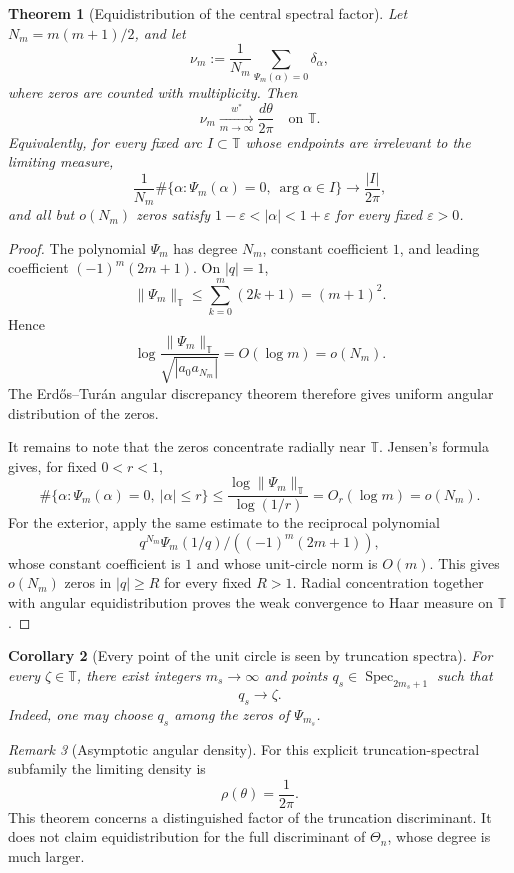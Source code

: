 \documentclass[11pt,a4paper,reqno]{amsart}
\newtheorem{theorem}{Theorem}[section]
\newtheorem{corollary}[theorem]{Corollary}
\theoremstyle{remark}
\newtheorem{remark}[theorem]{Remark}
\newcommand{\T}{\mathbb T}
\newcommand{\Spec}{\operatorname{Spec}}
\begin{document}
\begin{theorem}[Equidistribution of the central spectral factor]\label{thm:equidistribution}
Let \(N_m=m(m+1)/2\), and let
\[
        \nu_m:=\frac1{N_m}\sum_{\Psi_m(\alpha)=0}\delta_{\alpha},
\]
where zeros are counted with multiplicity.  Then
\[
        \nu_m\xrightarrow[m\to\infty]{w^*}\frac{d\theta}{2\pi}\quad\text{on }\T.
\]
Equivalently, for every fixed arc \(I\subset\T\) whose endpoints are irrelevant to the limiting measure,
\[
        \frac1{N_m}\#\{\alpha:\Psi_m(\alpha)=0,\ \arg\alpha\in I\}
        \longrightarrow \frac{|I|}{2\pi},
\]
and all but \(o(N_m)\) zeros satisfy \(1-\varepsilon<|\alpha|<1+\varepsilon\) for every fixed \(\varepsilon>0\).
\end{theorem}

\begin{proof}
The polynomial \(\Psi_m\) has degree \(N_m\), constant coefficient \(1\), and leading coefficient \((-1)^m(2m+1)\).  On \(|q|=1\),
\[
        \|\Psi_m\|_{\T}\le \sum_{k=0}^m(2k+1)=(m+1)^2.
\]
Hence
\[
        \log\frac{\|\Psi_m\|_{\T}}{\sqrt{|a_0a_{N_m}|}}
        =O(\log m)=o(N_m).
\]
The Erd\H os--Tur\'an angular discrepancy theorem \cite{ErdosTuran} therefore gives uniform angular distribution of the zeros.

It remains to note that the zeros concentrate radially near \(\T\).  Jensen's formula gives, for fixed \(0<r<1\),
\[
        \#\{\alpha:\Psi_m(\alpha)=0,\ |\alpha|\le r\}
        \le \frac{\log\|\Psi_m\|_{\T}}{\log(1/r)}=O_r(\log m)=o(N_m).
\]
For the exterior, apply the same estimate to the reciprocal polynomial
\[
        q^{N_m}\Psi_m(1/q)/((-1)^m(2m+1)),
\]
whose constant coefficient is \(1\) and whose unit-circle norm is \(O(m)\).  This gives \(o(N_m)\) zeros in \(|q|\ge R\) for every fixed \(R>1\).  Radial concentration together with angular equidistribution proves the weak convergence to Haar measure on \(\T\).
\end{proof}

\begin{corollary}[Every point of the unit circle is seen by truncation spectra]
For every \(\zeta\in\T\), there exist integers \(m_s\to\infty\) and points \(q_s\in\Spec_{2m_s+1}\) such that
\[
        q_s\to\zeta.
\]
Indeed, one may choose \(q_s\) among the zeros of \(\Psi_{m_s}\).
\end{corollary}

\begin{remark}[Asymptotic angular density]
For this explicit truncation-spectral subfamily the limiting density is
\[
        \rho(\theta)=\frac1{2\pi}.
\]
This theorem concerns a distinguished factor of the truncation discriminant.  It does not claim equidistribution for the full discriminant of \(\Theta_n\), whose degree is much larger.
\end{remark}
\end{document}
